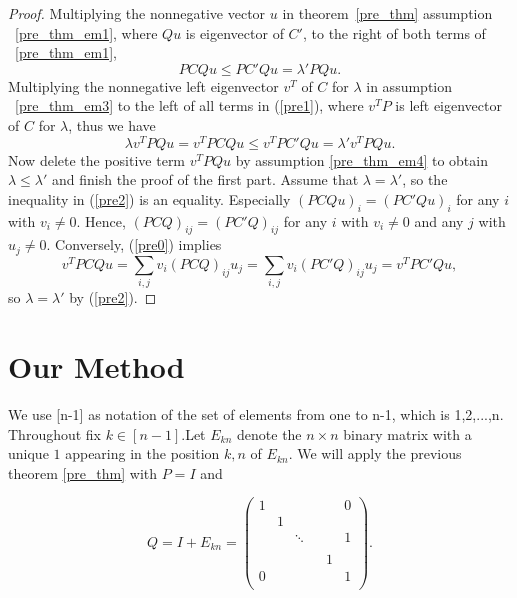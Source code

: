 \documentclass{article}
\theoremstyle{plain}
\theoremstyle{definition}
\begin{document}
\begin{proof}
    Multiplying the nonnegative vector $u$ in theorem~\ref{pre_thm} assumption
    ~\ref{pre_thm_em1}, where $Qu$ is eigenvector of $C'$,  to the right of both terms of
    ~\ref{pre_thm_em1},    
    \begin{equation}\label{pre1}
       PCQu\leq PC'Qu=\lambda'PQu.
    \end{equation}
    Multiplying the nonnegative left eigenvector $v^T$ of $C$ for $\lambda$ in assumption
     ~\ref{pre_thm_em3} to the left of all terms  in (\ref{pre1}), where $v^TP$ is
    left eigenvector of $C$ for $\lambda$, thus we have
    \begin{equation}\label{pre2}
        \lambda v^TPQu=v^TPCQu\leq v^TPC'Qu=\lambda' v^TPQu.
    \end{equation}
        Now delete the positive term $v^TPQu$ by assumption \ref{pre_thm_em4} to obtain
        $\lambda\leq \lambda'$ and finish the proof of the first part.
        Assume that $\lambda=\lambda'$, so the inequality in (\ref{pre2}) is an equality.
        Especially $(PCQu)_i=(PC'Qu)_i$ for any $i$ with $v_i\not=0.$ Hence,
        $(PCQ)_{ij}=(PC'Q)_{ij}$ for any $i$ with $v_i\not=0$ and any $j$ with
        $u_j\not=0.$ Conversely, (\ref{pre0}) implies $$v^TPCQu=\sum_{i,j} v_i(PCQ)_{ij}u_j=
         \sum_{i,j} v_i(PC'Q)_{ij}u_j=v^TPC'Qu,$$ so $\lambda=\lambda'$ by (\ref{pre2}).
\end{proof}

\section{Our Method}
We use [n-1] as notation of the set of elements from one to n-1, which is {1,2,$...$,n}.
Throughout fix $k\in [n-1]$.Let $E_{kn}$ denote the $n\times n$ binary matrix with a unique $1$ appearing in the position $k,n$ of $E_{kn}$. We will apply the previous theorem \ref{pre_thm} with $P=I$ and 



\begin{equation} \label{Q_1}
Q=I+E_{kn}=\begin{pmatrix} 
1 &  & & &  & 0 \\
 & 1 &  &      &  &  \\
 &  & \ddots & &  & 1 \\
 &  &        & &  &  \\
  &  & & & 1 &  \\
0 &  & & &  & 1 \\
\end{pmatrix}.  
\end{equation}
\end{document}
